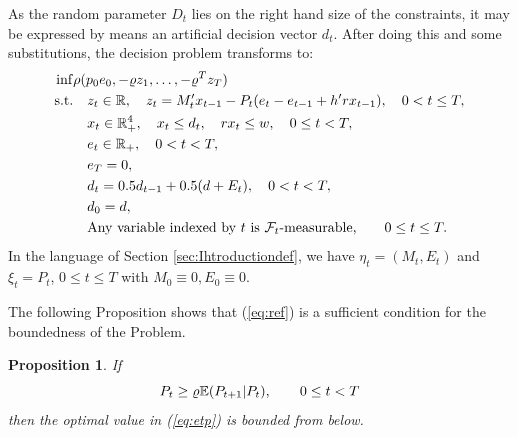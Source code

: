 \documentclass{article}              %
\newtheorem{proposition}{Proposition}
\begin{document}
As the random parameter $D_{t}$ lies on the right hand size of the
constraints, it may be expressed by means an artificial decision vector
$d_{t}$. After doing this and some substitutions, the decision problem
transforms to: 
\begin{align*}
\inf & \rho(p_{0}e_{0},-\varrho z_{1},\dots,-\varrho^{T}z_{T})\\
\text{s.t.} &\quad  z_{t}\in \mathbb{R},\quad  z_{t}=M'_{t}x_{t-1}-P_{t}(e_t-e_{t-1}+h'rx_{t-1}),\quad  0<t\leq T,\\
 &\quad  x_{t}\in\mathbb{R}_{+}^{4},\quad  x_{t}\leq d_{t},\quad  rx_{t}\leq w,\quad  0\leq t<T,\\
 &\quad  e_{t}\in\mathbb{R}_{+},\quad  0<t<T,\\
 &\quad  e_{T}=0,\\
 &\quad  d_{t}=0.5d_{t-1}+0.5(d+E_{t}),\quad  0<t<T,\\
 &\quad  d_{0}=d,\nonumber\\
 &\quad \text{Any variable indexed by $t$ is $\mathcal{F}_t$-measurable,}\qquad 0\leq t\leq T. \nonumber 
\end{align*}
In the language of Section \ref{sec:Ihtroductiondef}, we have $\eta_{t}=(M_{t},E_{t})$
and $\xi_{t}=P_{t}$, $0\leq t\leq T$ with $M_{0}\equiv0,$$E_{0}\equiv0.$ 

The following Proposition shows that (\ref{eq:ref}) is a sufficient
condition for the boundedness of the Problem.
\begin{proposition}
\label{prop:pprop}If 
\begin{equation}
P_{t}\geq\varrho\mathbb{E}(P_{t+1}|P_{t}),\qquad0\leq t<T\label{eq:eb}
\end{equation}
then the optimal value in (\ref{eq:etp}) is bounded from below.
\end{proposition}
\end{document}
